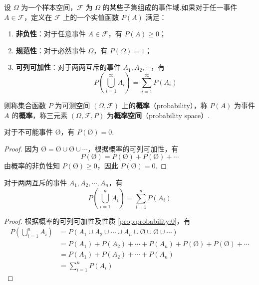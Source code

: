 \begin{definition}
    \indent 设 $\varOmega$ 为一个样本空间，$\mathcal{F}$ 为 $\varOmega$ 的某些子集组成的事件域.如果对于任一事件 $A \in \mathcal{F}$，定义在 $\mathcal{F}$ 上的一个实值函数 $P(A)$ 满足：
    \begin{enumerate}
        \item \textbf{非负性}：对于任意事件 $A \in \mathcal{F}$，有 $P(A) \geqslant 0$；
        \item \textbf{规范性}：对于必然事件 $\varOmega$，有 $P(\varOmega)=1$；
        \item \textbf{可列可加性}：对于两两互斥的事件 $A_1,A_2,\cdots$，有
        $$
        P \left(\bigcup_{i=1}^\infty A_i \right) = \sum_{i=1}^\infty P(A_i)
        $$
    \end{enumerate}
    则称集合函数 $P$ 为可测空间 $(\varOmega, \mathcal{F})$ 上的\textbf{概率}（probability），称 $P(A)$ 为事件 $A$ 的\textbf{概率}，称三元素 $(\varOmega, \mathcal{F}, P)$ 为\textbf{概率空间}（probability space）.
\end{definition}

\begin{property}
    \indent 对于不可能事件 $\text{\O}$，有 $P(\text{\O})=0$.
\end{property}

\begin{proof}
    因为 $\text{\O} = \text{\O} \cup \text{\O} \cup \cdots$，根据概率的可列可加性，有
    $$
    P(\text{\O}) = P(\text{\O}) + P(\text{\O}) + \cdots
    $$
    由概率的非负性知 $P(\text{\O}) \geqslant 0$，因此 $P(\text{\O})=0$.
\end{proof}

\begin{property}
    \indent 对于两两互斥的事件 $A_1,A_2,\cdots,A_n$，有
    \begin{equation}
        P \left(\bigcup_{i=1}^n A_i \right) = \sum_{i=1}^n P(A_i)
    \end{equation}
\end{property}

\begin{proof}
    根据概率的可列可加性及性质 \ref{prop:probability:0}，有
    $$
    \begin{aligned}
        P \left(\bigcup_{i=1}^n A_i \right) &= P(A_1 \cup A_2 \cup \cdots \cup A_n \cup \text{\O} \cup \text{\O} \cup \cdots) \\
        &= P(A_1) + P(A_2) + \cdots + P(A_n) + P(\text{\O}) + P(\text{\O}) + \cdots \\
        &= P(A_1) + P(A_2) + \cdots + P(A_n) \\
        &= \sum_{i=1}^n P(A_i)
    \end{aligned}
    $$

    \vspace{-2em}
\end{proof}

